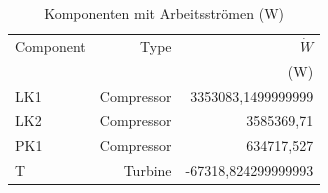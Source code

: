 \begin{longtable}{lrr}
\caption{Komponenten mit Arbeitsströmen (W)} \\
\hline
Component & Type & $\dot W$ \\
 &  & (W) \\
\hline
LK1 & Compressor & 3353083,1499999999 \\
LK2 & Compressor & 3585369,71 \\
PK1 & Compressor & 634717,527 \\
T & Turbine & -67318,824299999993 \\
\hline
\end{longtable}
